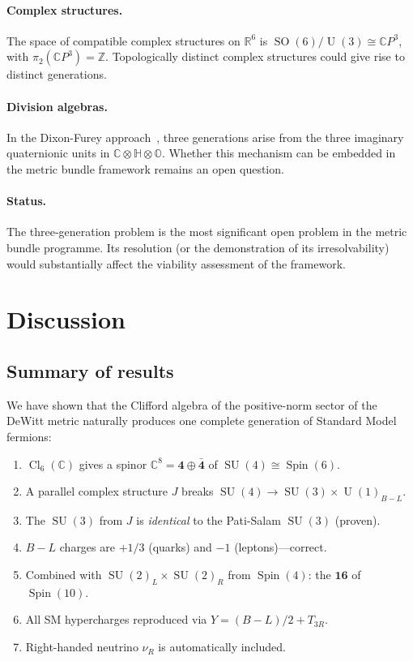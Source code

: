 \documentclass[12pt,a4paper]{article}
\theoremstyle{definition}
\newcommand{\SO}{\operatorname{SO}}
\newcommand{\SU}{\operatorname{SU}}
\newcommand{\U}{\operatorname{U}}
\newcommand{\Spin}{\operatorname{Spin}}
\newcommand{\Cl}{\operatorname{Cl}}
\newcommand{\R}{\mathbb{R}}
\newcommand{\C}{\mathbb{C}}
\newcommand{\Z}{\mathbb{Z}}
\begin{document}
\paragraph{Complex structures.}
The space of compatible complex structures on $\R^6$ is $\SO(6)/\U(3) \cong \C P^3$, with $\pi_2(\C P^3) = \Z$.
Topologically distinct complex structures could give rise to distinct generations.

\paragraph{Division algebras.}
In the Dixon-Furey approach~\cite{Dixon1994,Furey2016}, three generations arise from the three imaginary quaternionic units in $\C \otimes \mathbb{H} \otimes \mathbb{O}$.
Whether this mechanism can be embedded in the metric bundle framework remains an open question.

\paragraph{Status.}
The three-generation problem is the most significant open problem in the metric bundle programme.
Its resolution (or the demonstration of its irresolvability) would substantially affect the viability assessment of the framework.


\section{Discussion}
\label{sec:discussion}

\subsection{Summary of results}

We have shown that the Clifford algebra of the positive-norm sector of the DeWitt metric naturally produces one complete generation of Standard Model fermions:

\begin{enumerate}[nosep]
\item $\Cl_6(\C)$ gives a spinor $\C^8 = \mathbf{4} \oplus \bar{\mathbf{4}}$ of $\SU(4) \cong \Spin(6)$.
\item A parallel complex structure $J$ breaks $\SU(4) \to \SU(3) \times \U(1)_{B-L}$.
\item The $\SU(3)$ from $J$ is \emph{identical} to the Pati-Salam $\SU(3)$ (proven).
\item $B-L$ charges are $+1/3$ (quarks) and $-1$ (leptons)---correct.
\item Combined with $\SU(2)_L \times \SU(2)_R$ from $\Spin(4)$: the $\mathbf{16}$ of $\Spin(10)$.
\item All SM hypercharges reproduced via $Y = (B{-}L)/2 + T_{3R}$.
\item Right-handed neutrino $\nu_R$ is automatically included.
\end{enumerate}
\end{document}
